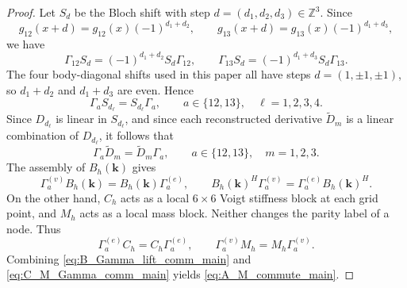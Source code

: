 \documentclass[10pt,a4paper]{amsart}
\newcommand{\bk}{\bm{k}}
\begin{document}
\begin{proof}
Let \(S_d\) be the Bloch shift with step \(d=(d_1,d_2,d_3)\in\mathbb Z^3\). Since
\[
g_{12}(x+d)=g_{12}(x)(-1)^{d_1+d_2},\qquad
g_{13}(x+d)=g_{13}(x)(-1)^{d_1+d_3},
\]
we have
\begin{equation}\label{eq:Gamma_shift_comm_maintext}
\Gamma_{12}S_d=(-1)^{d_1+d_2}S_d\Gamma_{12},
\qquad
\Gamma_{13}S_d=(-1)^{d_1+d_3}S_d\Gamma_{13}.
\end{equation}
The four body-diagonal shifts used in this paper all have steps \(d=(1,\pm1,\pm1)\), so \(d_1+d_2\) and \(d_1+d_3\) are even. Hence
\[
\Gamma_a S_{d_\ell}=S_{d_\ell}\Gamma_a,
\qquad a\in\{12,13\},\quad \ell=1,2,3,4.
\]
Since \(D_{d_\ell}\) is linear in \(S_{d_\ell}\), and since each reconstructed derivative \(\widetilde D_m\) is a linear combination of \(D_{d_\ell}\), it follows that
\begin{equation}\label{eq:Gamma_Dtilde_comm_main}
\Gamma_a\widetilde D_m=\widetilde D_m\Gamma_a,
\qquad a\in\{12,13\},\quad m=1,2,3.
\end{equation}
The assembly of \(B_h(\bk)\) gives
\begin{equation}\label{eq:B_Gamma_lift_comm_main}
\Gamma_a^{(v)}B_h(\bk)=B_h(\bk)\Gamma_a^{(e)},
\qquad
B_h(\bk)^H\Gamma_a^{(v)}=\Gamma_a^{(e)}B_h(\bk)^H.
\end{equation}
On the other hand, \(C_h\) acts as a local \(6\times6\) Voigt stiffness block at each grid point, and \(M_h\) acts as a local mass block. Neither changes the parity label of a node. Thus
\begin{equation}\label{eq:C_M_Gamma_comm_main}
\Gamma_a^{(e)}C_h=C_h\Gamma_a^{(e)},
\qquad
\Gamma_a^{(v)}M_h=M_h\Gamma_a^{(v)}.
\end{equation}
Combining \eqref{eq:B_Gamma_lift_comm_main} and \eqref{eq:C_M_Gamma_comm_main} yields \eqref{eq:A_M_commute_main}.
\end{proof}
\end{document}
